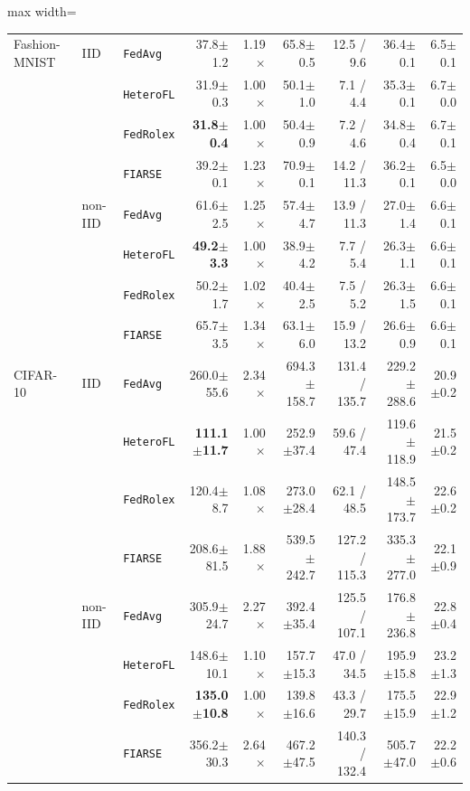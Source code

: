 \begin{table}[H]
\begin{adjustbox}{max width=\textwidth}
\begin{tabular}{@{}lllrrrrrr@{}}
\midrule
Fashion-MNIST & IID & \texttt{FedAvg} & 37.8$\pm$1.2 & 1.19$\times$ & 65.8$\pm$0.5 & 12.5 / 9.6 & 36.4$\pm$0.1 & 6.5$\pm$0.1 \\
 &  & \texttt{HeteroFL} & 31.9$\pm$0.3 & 1.00$\times$ & 50.1$\pm$1.0 & 7.1 / 4.4 & 35.3$\pm$0.1 & 6.7$\pm$0.0 \\
 &  & \texttt{FedRolex} & \textbf{31.8$\pm$0.4} & 1.00$\times$ & 50.4$\pm$0.9 & 7.2 / 4.6 & 34.8$\pm$0.4 & 6.7$\pm$0.1 \\
 &  & \texttt{FIARSE} & 39.2$\pm$0.1 & 1.23$\times$ & 70.9$\pm$0.1 & 14.2 / 11.3 & 36.2$\pm$0.1 & 6.5$\pm$0.0 \\
\midrule
 & non-IID & \texttt{FedAvg} & 61.6$\pm$2.5 & 1.25$\times$ & 57.4$\pm$4.7 & 13.9 / 11.3 & 27.0$\pm$1.4 & 6.6$\pm$0.1 \\
 &  & \texttt{HeteroFL} & \textbf{49.2$\pm$3.3} & 1.00$\times$ & 38.9$\pm$4.2 & 7.7 / 5.4 & 26.3$\pm$1.1 & 6.6$\pm$0.1 \\
 &  & \texttt{FedRolex} & 50.2$\pm$1.7 & 1.02$\times$ & 40.4$\pm$2.5 & 7.5 / 5.2 & 26.3$\pm$1.5 & 6.6$\pm$0.1 \\
 &  & \texttt{FIARSE} & 65.7$\pm$3.5 & 1.34$\times$ & 63.1$\pm$6.0 & 15.9 / 13.2 & 26.6$\pm$0.9 & 6.6$\pm$0.1 \\
\midrule
CIFAR-10 & IID & \texttt{FedAvg} & 260.0$\pm$55.6 & 2.34$\times$ & 694.3$\pm$158.7 & 131.4 / 135.7 & 229.2$\pm$288.6 & 20.9$\pm$0.2 \\
 &  & \texttt{HeteroFL} & \textbf{111.1$\pm$11.7} & 1.00$\times$ & 252.9$\pm$37.4 & 59.6 / 47.4 & 119.6$\pm$118.9 & 21.5$\pm$0.2 \\
 &  & \texttt{FedRolex} & 120.4$\pm$8.7 & 1.08$\times$ & 273.0$\pm$28.4 & 62.1 / 48.5 & 148.5$\pm$173.7 & 22.6$\pm$0.2 \\
 &  & \texttt{FIARSE} & 208.6$\pm$81.5 & 1.88$\times$ & 539.5$\pm$242.7 & 127.2 / 115.3 & 335.3$\pm$277.0 & 22.1$\pm$0.9 \\
\midrule
 & non-IID & \texttt{FedAvg} & 305.9$\pm$24.7 & 2.27$\times$ & 392.4$\pm$35.4 & 125.5 / 107.1 & 176.8$\pm$236.8 & 22.8$\pm$0.4 \\
 &  & \texttt{HeteroFL} & 148.6$\pm$10.1 & 1.10$\times$ & 157.7$\pm$15.3 & 47.0 / 34.5 & 195.9$\pm$15.8 & 23.2$\pm$1.3 \\
 &  & \texttt{FedRolex} & \textbf{135.0$\pm$10.8} & 1.00$\times$ & 139.8$\pm$16.6 & 43.3 / 29.7 & 175.5$\pm$15.9 & 22.9$\pm$1.2 \\
 &  & \texttt{FIARSE} & 356.2$\pm$30.3 & 2.64$\times$ & 467.2$\pm$47.5 & 140.3 / 132.4 & 505.7$\pm$47.0 & 22.2$\pm$0.6 \\
\bottomrule
\end{tabular}
\end{adjustbox}
\end{table}
